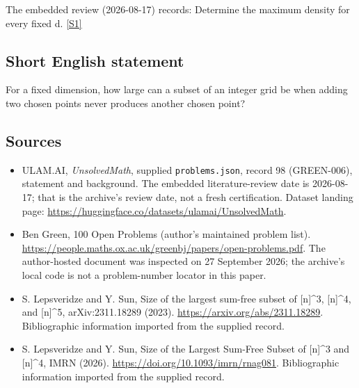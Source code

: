 \documentclass[11pt,a4paper]{article}
\newcommand{\sref}[2]{\hyperlink{source:#1:#2}{[S#2]}}
\begin{document}
The embedded review (2026-08-17) records: Determine the maximum density for every fixed d. \sref{98}{1}

\subsection{Short English statement}

For a fixed dimension, how large can a subset of an integer grid be when adding two chosen points never produces another chosen point?

\subsection{Sources}

{\small

\begin{itemize}

\item[\hypertarget{source:98:1}{S1}] ULAM.AI, \emph{UnsolvedMath}, supplied \texttt{problems.json}, record 98 (GREEN-006), statement and background. The embedded literature-review date is 2026-08-17; that is the archive’s review date, not a fresh certification. Dataset landing page: \url{https://huggingface.co/datasets/ulamai/UnsolvedMath}.

\item[\hypertarget{source:98:2}{S2}] Ben Green, 100 Open Problems (author’s maintained problem list). \url{https://people.maths.ox.ac.uk/greenbj/papers/open-problems.pdf}. The author-hosted document was inspected on 27 September 2026; the archive’s local code is not a problem-number locator in this paper.

\item[\hypertarget{source:98:3}{S3}] S. Lepsveridze and Y. Sun, Size of the largest sum-free subset of [n]\textasciicircum{}3, [n]\textasciicircum{}4, and [n]\textasciicircum{}5, arXiv:2311.18289 (2023). \url{https://arxiv.org/abs/2311.18289}. Bibliographic information imported from the supplied record.

\item[\hypertarget{source:98:4}{S4}] S. Lepsveridze and Y. Sun, Size of the Largest Sum-Free Subset of [n]\textasciicircum{}3 and [n]\textasciicircum{}4, IMRN (2026). \url{https://doi.org/10.1093/imrn/rnag081}. Bibliographic information imported from the supplied record.

\end{itemize}

}

\label{end:98}
\end{document}
